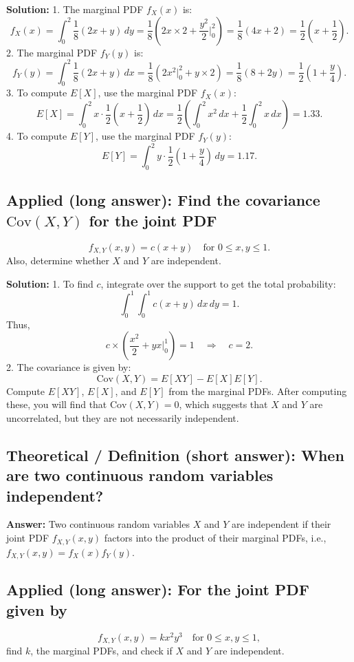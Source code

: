 \documentclass[12pt]{article}
\begin{document}
\textbf{Solution:}
1. The marginal PDF \( f_X(x) \) is:
\[
f_X(x) = \int_0^2 \frac{1}{8} (2x + y) \, dy = \frac{1}{8} \left( 2x \times 2 + \frac{y^2}{2} \Bigg|_0^2 \right) = \frac{1}{8} (4x + 2) = \frac{1}{2} (x + \frac{1}{2}).
\]
2. The marginal PDF \( f_Y(y) \) is:
\[
f_Y(y) = \int_0^2 \frac{1}{8} (2x + y) \, dx = \frac{1}{8} \left( 2x^2 \Bigg|_0^2 + y \times 2 \right) = \frac{1}{8} (8 + 2y) = \frac{1}{2} (1 + \frac{y}{4}).
\]
3. To compute \( E[X] \), use the marginal PDF \( f_X(x) \):
\[
E[X] = \int_0^2 x \cdot \frac{1}{2} (x + \frac{1}{2}) \, dx = \frac{1}{2} \left( \int_0^2 x^2 \, dx + \frac{1}{2} \int_0^2 x \, dx \right) = 1.33.
\]
4. To compute \( E[Y] \), use the marginal PDF \( f_Y(y) \):
\[
E[Y] = \int_0^2 y \cdot \frac{1}{2} (1 + \frac{y}{4}) \, dy = 1.17.
\]

\subsection{Applied (long answer): Find the covariance \( \text{Cov}(X, Y) \) for the joint PDF}
\[
f_{X,Y}(x, y) = c (x + y) \quad \text{for } 0 \leq x, y \leq 1.
\]
Also, determine whether \( X \) and \( Y \) are independent.

\textbf{Solution:}
1. To find \( c \), integrate over the support to get the total probability:
\[
\int_0^1 \int_0^1 c (x + y) \, dx \, dy = 1.
\]
Thus,
\[
c \times \left( \frac{x^2}{2} + yx \Bigg|_0^1 \right) = 1 \quad \Rightarrow \quad c = 2.
\]
2. The covariance is given by:
\[
\text{Cov}(X, Y) = E[XY] - E[X]E[Y].
\]
Compute \( E[XY] \), \( E[X] \), and \( E[Y] \) from the marginal PDFs. After computing these, you will find that \( \text{Cov}(X, Y) = 0 \), which suggests that \( X \) and \( Y \) are uncorrelated, but they are not necessarily independent.

\subsection{Theoretical / Definition (short answer): When are two continuous random variables independent?}

\textbf{Answer:} Two continuous random variables \( X \) and \( Y \) are independent if their joint PDF \( f_{X,Y}(x, y) \) factors into the product of their marginal PDFs, i.e., \( f_{X,Y}(x, y) = f_X(x) f_Y(y) \).

\subsection{Applied (long answer): For the joint PDF given by}
\[
f_{X,Y}(x, y) = k x^2 y^3 \quad \text{for } 0 \leq x, y \leq 1,
\]
find \( k \), the marginal PDFs, and check if \( X \) and \( Y \) are independent.
\end{document}
